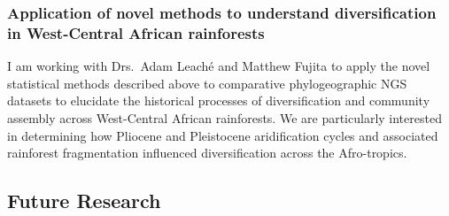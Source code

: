 \subsubsection*{Application of novel methods to understand diversification
in West-Central African rainforests}
I am working with Drs.\ Adam Leach\'{e} and Matthew Fujita to apply the novel
statistical methods described above to comparative phylogeographic NGS datasets
to elucidate the historical processes of diversification and community assembly
across West-Central African rainforests.
We are particularly interested in determining how Pliocene and Pleistocene
aridification cycles and associated rainforest fragmentation influenced
diversification across the Afro-tropics.


\subsection*{Future Research}


